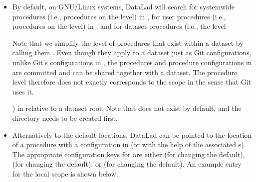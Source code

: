 \begin{itemize}
\item {} 
\sphinxAtStartPar
By default, on GNU/Linux systems, DataLad will search for system\sphinxhyphen{}wide procedures
(i.e., procedures on the  level) in ,
for user procedures (i.e., procedures on the  level) in ,
and for dataset procedures (i.e., the  level%
\begin{footnote}\sphinxAtStartFootnote
Note that we simplify the level of procedures that exist within a dataset
by calling them . Even though they apply to a dataset just as 
Git configurations, unlike Git’s  configurations in ,
the procedures and procedure configurations in  are committed
and can be shared together with a dataset. The procedure level  therefore
does not exactly corresponds to the  scope in the sense that Git uses it.
%
\end{footnote}) in 
relative to a dataset root.
Note that  does not exist by default, and the 
directory needs to be created first.

\item {} 
\sphinxAtStartPar
Alternatively to the default locations, DataLad can be pointed to the location of a procedure with a configuration in  (or with the help of the associated {\hyperref[\detokenize{glossary:term-environment-variable}]{}}s).
The appropriate configuration keys for  are either  (for changing the  default),  (for changing the  default), or  (for changing the  default).
An example  entry for the local scope is shown below.


\end{itemize}

